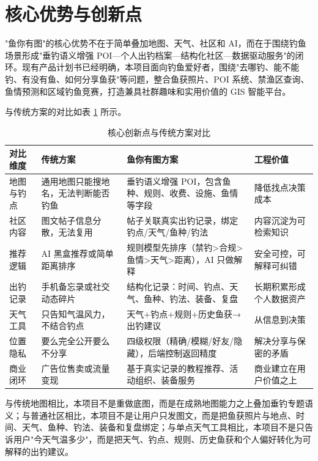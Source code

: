 \section{核心优势与创新点}

"鱼你有图"的核心优势不在于简单叠加地图、天气、社区和 AI，而在于围绕钓鱼场景形成"垂钓语义增强 POI—个人出钓档案—结构化社区—数据驱动服务"的闭环。现有产品计划书已经明确，本项目面向钓鱼爱好者，围绕"去哪钓、能不能钓、有没有鱼、如何分享鱼获"等问题，整合鱼获照片、POI 系统、禁渔区查询、鱼情预测和区域钓鱼竞赛，打造兼具社群趣味和实用价值的 GIS 智能平台。

与传统方案的对比如表 \ref{tab:innovation-comparison} 所示。

\begin{table}[htbp]
  \centering\small
  \caption{核心创新点与传统方案对比}
  \label{tab:innovation-comparison}
  \begin{tabularx}{\textwidth}{>{\raggedright\arraybackslash}p{2.0cm}|>{\raggedright\arraybackslash}p{3.2cm}|X|>{\raggedright\arraybackslash}p{2.6cm}}
    \toprule
    \textbf{对比维度} & \textbf{传统方案} & \textbf{鱼你有图方案} & \textbf{工程价值} \\
    \midrule
    地图与钓点 & 通用地图只能搜地名，无法判断能否钓鱼 & 垂钓语义增强 POI，包含鱼种、规则、收费、设施、鱼情等字段 & 降低找点决策成本 \\
    \hline
    社区内容 & 图文帖子信息分散，无法复用 & 帖子关联真实出钓记录，绑定钓点/天气/鱼种/钓法 & 内容沉淀为可检索知识 \\
    \hline
    推荐逻辑 & AI 黑盒推荐或简单距离排序 & 规则模型先排序（禁钓>合规>鱼情>天气>距离），AI 只做解释 & 安全可控，可解释可纠错 \\
    \hline
    出钓记录 & 手机备忘录或社交动态碎片 & 结构化记录：时间、钓点、天气、鱼种、钓法、装备、复盘 & 长期积累形成个人数据资产 \\
    \hline
    天气工具 & 只告知气温风力，不结合钓点 & 天气+钓点+规则+历史鱼获→出钓建议 & 从信息到决策 \\
    \hline
    位置隐私 & 要么完全公开要么不分享 & 四级权限（精确/模糊/好友/隐藏），后端控制返回精度 & 解决分享与保密的矛盾 \\
    \hline
    商业闭环 & 广告位售卖或流量变现 & 基于真实记录的教程推荐、活动组织、装备服务 & 商业建立在用户价值之上 \\
    \bottomrule
  \end{tabularx}
\end{table}

与传统地图相比，本项目不是重做底图，而是在成熟地图能力之上叠加垂钓专题语义；与普通社区相比，本项目不是让用户只发图文，而是把鱼获照片与地点、时间、天气、鱼种、钓法、装备和复盘绑定；与单点天气工具相比，本项目不是只告诉用户"今天气温多少"，而是把天气、钓点、规则、历史鱼获和个人偏好转化为可解释的出钓建议。

